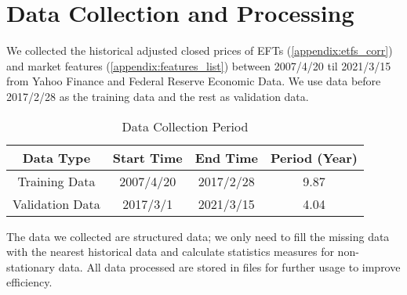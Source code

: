 \section{Data Collection and Processing}
We collected the historical adjusted closed prices of EFTs (\autoref{appendix:etfs_corr}) and market features (\autoref{appendix:features_list}) between 2007/4/20 til  2021/3/15 from Yahoo Finance and Federal Reserve Economic Data. We use data before 2017/2/28 as the training data and the rest as validation data.
\begin{table}[htb]
    \centering
        \begin{tabular}{||c|c|c|c||}
        \hline \hline
        Data Type & Start Time & End Time & Period (Year) \\ \hline \hline
        Training Data  &  2007/4/20 & 2017/2/28 & 9.87\\ \hline
        Validation Data & 2017/3/1 & 2021/3/15 & 4.04 \\ 
        \hline \hline
        \end{tabular}
    \caption{Data Collection Period}
    \label{tab:dataset}
\end{table}
\par
The data we collected are structured data; we only need to fill the missing data with the nearest historical data and calculate statistics measures for non-stationary data. All data processed are stored in files for further usage to improve efficiency. 